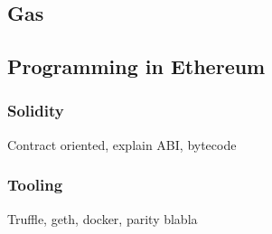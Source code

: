 \subsection{Gas}

\subsection{Programming in Ethereum}
\subsubsection{Solidity}
Contract oriented, explain ABI, bytecode

\subsubsection{Tooling}
Truffle, geth, docker, parity blabla
